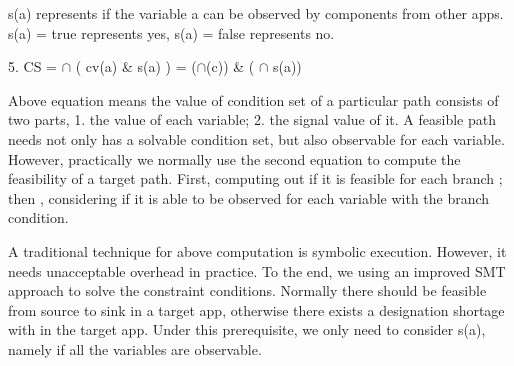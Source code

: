 \documentclass{sig-alternate-05-2015}
\begin{document}
s(a) represents if the variable a can be observed by components from other apps. s(a) = true represents yes, s(a) = false represents no.

5. CS = $\cap$ ( cv(a) \& s(a) ) = ($\cap$(c)) \& ( $\cap$ s(a))

Above equation means the value of condition set of a particular path consists of two parts, 1. the value of each variable; 2. the signal value of it. A feasible path needs not only has a solvable condition set, but also observable for each variable. However, practically we normally use the second equation to compute the feasibility of a target path. First, computing out if it is feasible for each branch ; then , considering if it is able to be observed for each variable with the branch condition.

A traditional technique for above computation is symbolic execution. However, it needs unacceptable overhead in practice. {\color {red} To the end, we using an improved SMT approach to solve the constraint conditions.} Normally there should be feasible from source to sink in a target app, otherwise there exists a designation shortage with in the target app. Under this prerequisite, we only need to consider s(a), namely if all the variables are observable. 



%
%
\end{document}

